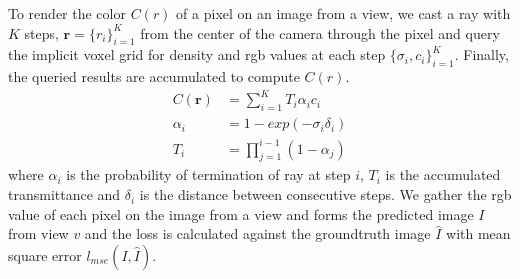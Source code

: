 To render the color $C(r)$ of a pixel on an image from a view, we cast a ray with $K$ steps, $\bm{r}=\{r_i\}_{i=1}^K$ from the center of the camera through the pixel and query the implicit voxel grid for density and rgb values at each step $\{\sigma_i, c_i\}_{i=1}^K$.
Finally, the queried results are accumulated to compute $C(r)$.
\begin{subequations}
    \begin{align}
        \label{accu}
        C(\bm{r}) &= \sum_{i=1}^{K}T_i \alpha_i c_i \\
        \alpha_i &= 1 - exp(-\sigma_i \delta_i) \\
        T_i &= \prod_{j=1}^{i-1} (1-\alpha_j)
    \end{align}
\end{subequations}
where $\alpha_i$ is the probability of termination of ray at step $i$, $T_i$ is the accumulated transmittance and $\delta_i$ is the distance between consecutive steps.
We gather the rgb value of each pixel on the image from a view and forms the predicted image $I$ from view $v$ and the loss is calculated against the groundtruth image $\hat{I}$ with mean square error $l_{mse}(I, \hat{I})$.